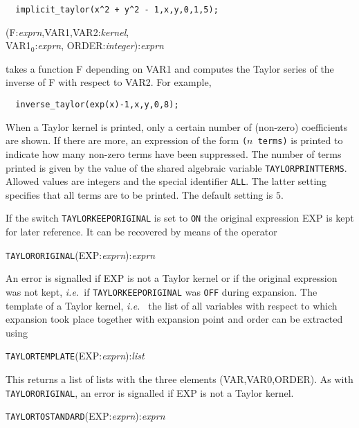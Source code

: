 \documentclass[11pt,letterpaper]{book}
\makeatletter
\newcommand{\underscore}{\_}
\newcommand{\ttindex}[1]{{\renewcommand{\_}{\protect\underscore}%
                          \index{#1@{\tt #1}}}}
\makeatother
\begin{document}
{\small\begin{verbatim}
  implicit_taylor(x^2 + y^2 - 1,x,y,0,1,5);
\end{verbatim}}

(F:{\em exprn},VAR1,VAR2:{\em kernel},\\
VAR1$_0$:{\em exprn},
                                 ORDER:{\em integer}):{\em exprn}

takes a function F depending on VAR1 and computes the Taylor series of
the inverse of F with respect to VAR2.  For example,

{\small\begin{verbatim}
  inverse_taylor(exp(x)-1,x,y,0,8);
\end{verbatim}}


When a Taylor kernel is printed, only a certain number of (non-zero)
coefficients are shown.  If there are more, an expression of the form
\verb|(|$n$\verb| terms)| is printed to indicate how many non-zero
terms have been suppressed.  The number of terms printed is given by
the value of the shared algebraic variable \verb|TAYLORPRINTTERMS|.
Allowed values are integers and the special identifier \verb|ALL|.  The
latter setting specifies that all terms are to be printed.  The default
setting is $5$.


If the switch \verb|TAYLORKEEPORIGINAL| is set to \verb|ON| the
original expression EXP is kept for later reference.
It can be recovered by means of the operator

\hspace*{2em} {\tt TAYLORORIGINAL}(EXP:{\em exprn}):{\em exprn}

An error is signalled if EXP is not a Taylor kernel or if the original
expression was not kept, {\em i.e.\ }if \verb|TAYLORKEEPORIGINAL| was
\verb|OFF| during expansion.  The template of a Taylor kernel, {\em i.e.\ }
the list of all variables with respect to which expansion took place
together with expansion point and order can be extracted using
\ttindex{TAYLORTEMPLATE}

\hspace*{2em} {\tt TAYLORTEMPLATE}(EXP:{\em exprn}):{\em list}

This returns a list of lists with the three elements (VAR,VAR0,ORDER).
As with \verb|TAYLORORIGINAL|, an error is signalled if EXP is not a
Taylor kernel.

\hspace*{2em} {\tt TAYLORTOSTANDARD}(EXP:{\em exprn}):{\em exprn}
\end{document}
